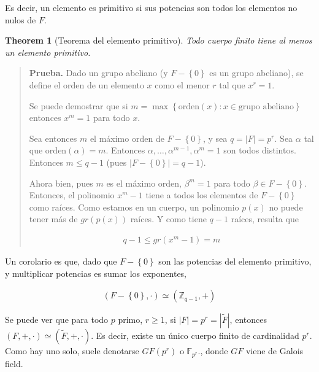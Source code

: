 \documentclass[a4paper]{article}
\newtheorem{theorem}{Theorem}
\newtheorem{theorem}{Theorem}
\begin{document}
Es decir, un elemento es primitivo si sus potencias son todos 
los elementos no nulos de $F$.

\begin{theorem}[Teorema del elemento primitivo]
    Todo cuerpo finito tiene al menos un elemento 
    primitivo.
\end{theorem}



\small
\begin{quote}

\textbf{Prueba.} Dado un grupo abeliano (y $F - \left\{ 0 \right\} $ es un
grupo abeliano), se define el orden de un elemento 
$x$ como el menor $r$ tal que $x^r = 1$.

Se puede demostrar que si $m = \max \left\{ \text{orden}(x) : x \in \text{grupo
abeliano} \right\} $ entonces $x^m = 1$ para todo $x$.

Sea entonces $m$ el máximo orden de $F - \left\{ 0 \right\} $, y sea $q = |F| =
p^r$. Sea $\alpha$ tal que $\text{orden}(\alpha) = m$. Entonces $\alpha,
\ldots, \alpha^{m-1}, \alpha^m = 1$ son todos distintos. Entonces $m \leq q -
1$ (pues $|F - \left\{ 0 \right\}| = q - 1 $).

Ahora bien, pues $m$ es el máximo orden, $\beta^m = 1$ para todo $\beta \in F -
\left\{ 0 \right\} $. Entonces, el polinomio $x^m - 1$ tiene a todos los
elementos de $F - \left\{ 0 \right\} $ como raíces. Como estamos
en un cuerpo, un polinomio $p(x)$ no puede tener más de 
$gr(p(x))$ raíces. Y como tiene $q - 1$ raíces, resulta que 

\begin{align*}
    q - 1 \leq gr(x^m - 1) = m
\end{align*}



\end{quote}
\normalsize

Un corolario es que, dado que $F - \left\{ 0 \right\} $ son las potencias 
del elemento primitivo, y multiplicar potencias es sumar los 
exponentes, 

\begin{align*}
    (F - \left\{ 0 \right\}, \cdot ) \simeq (\mathbb{Z}_{q - 1}, +)
\end{align*}

Se puede ver que para todo $p$ primo, $r \geq 1$, si $|F| = p^r = |\tilde{ F
}|$, entonces $(F, +, \cdot) \simeq (\tilde{ F }, +, \cdot)$. Es decir, existe
un único cuerpo finito de cardinalidad $p^r$. Como hay uno solo, suele
denotarse $GF(p^r)$ o $\mathbb{F}_{p^r}$., donde $GF$ viene de Galois field.
\end{document}
